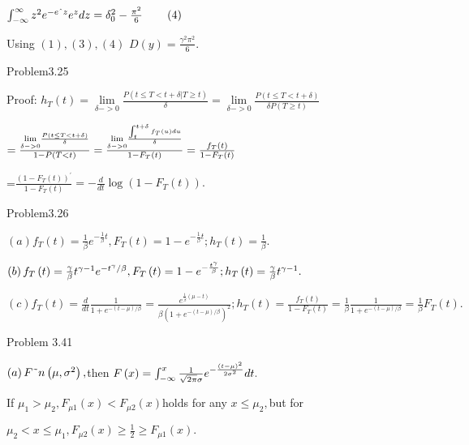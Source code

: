 \documentclass{article}
\begin{document}
$\int_{-\infty }^{\infty }z^{2}e^{-e\symbol{94}z}e^{z}dz=\delta _{0}^{2}-%
\frac{\pi ^{2}}{6}\qquad \left( 4\right) $

Using $\left( 1\right) ,\left( 3\right) ,\left( 4\right) $ $D\left( y\right)
=\frac{\gamma ^{2}\pi ^{2}}{6}.$

\bigskip

Problem3.25

Proof: $h_{T}\left( t\right) =\underset{\delta ->0}{\lim }\frac{P\left(
t\leq T<t+\delta |T\geq t\right) }{\delta }=\underset{\delta ->0}{\lim }%
\frac{P\left( t\leq T<t+\delta \right) }{\delta P\left( T\geq t\right) }$

$=\frac{\underset{\delta ->0}{\lim }\frac{P\left( t\leq T<t+\delta \right) }{%
\delta }}{1-P\left( T<t\right) }=\frac{\underset{\delta ->0}{\lim }\frac{%
\int_{t}^{t+\delta }f_{T}\left( u\right) du}{\delta }}{1-F_{T}\left(
t\right) }=\frac{f_{T}\left( t\right) }{1-F_{T}\left( t\right) }$

=$\frac{\left( 1-F_{T}\left( t\right) \right) ^{\prime }}{1-F_{T}\left(
t\right) }=-\frac{d}{dt}\log \left( 1-F_{T}\left( t\right) \right) .$

Problem3.26

$\left( a\right) f_{T}\left( t\right) =\frac{1}{\beta }e^{-\frac{1}{\beta }%
t},F_{T}\left( t\right) =1-e^{-\frac{1}{\beta }t};h_{T}\left( t\right) =%
\frac{1}{\beta }.$

$\left( b\right) f_{T}\left( t\right) =\frac{\gamma }{\beta }t^{\gamma
-1}e^{-t^{\gamma }/\beta },F_{T}\left( t\right) =1-e^{-\frac{t^{\gamma }}{%
\beta }};h_{T}\left( t\right) =\frac{\gamma }{\beta }t^{\gamma -1}.$

$\left( c\right) f_{T}\left( t\right) =\frac{d}{dt}\frac{1}{1+e^{-\left(
t-\mu \right) /\beta }}=\allowbreak \frac{e^{\frac{1}{\beta }\left( \mu
-t\right) }}{\beta \left( 1+e^{-\left( t-\mu \right) /\beta }\right) ^{2}}%
;h_{T}\left( t\right) =\frac{f_{T}\left( t\right) }{1-F_{T}\left( t\right) }=%
\frac{1}{\beta }\frac{1}{1+e^{-\left( t-\mu \right) /\beta }}=\frac{1}{\beta 
}F_{T}\left( t\right) .$

Problem 3.41

$\left( a\right) F\symbol{126}n\left( \mu ,\sigma ^{2}\right) ,$then $%
F\left( x\right) =\int_{-\infty }^{x}\frac{1}{\sqrt{2\pi }\sigma }e^{-\frac{%
\left( t-\mu \right) ^{2}}{2\sigma ^{2}}}dt.\qquad $

If $\mu _{1}>\mu _{2},F_{\mu 1}(x)<F_{\mu 2}\left( x\right) $holds for any $%
x\leq \mu _{2},$but for

$\mu _{2}<x\leq \mu _{1},F_{\mu 2}\left( x\right) \geq \frac{1}{2}\geq
F_{\mu 1}\left( x\right) .$
\end{document}
